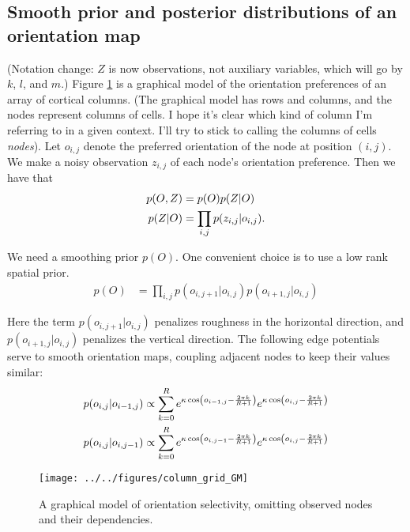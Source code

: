 \documentclass[11pt]{article}
\begin{document}
\subsection{Smooth prior and posterior distributions of an orientation map}

(Notation change: $Z$ is now observations, not auxiliary variables, which will go by $k$, $l$, and $m$.) Figure \ref{fig:som_gm0} is a graphical model of the orientation preferences of an array of cortical columns.  (The graphical model has rows and columns, and the nodes represent columns of cells. I hope it's clear which kind of column I'm referring to in a given context. I'll try to stick to calling the columns of cells {\it nodes}). Let $o_{i,j}$ denote the preferred orientation of the node at position $(i,j)$.  We make a noisy observation $z_{i,j}$ of each node's orientation preference. Then we have that
%
\begin{align}
p(O,Z) &= p(O) p(Z|O) \notag \\
p(Z|O) &= \prod_{i,j} p( z_{i,j} | o_{i,j} ).
\end{align}

We need a smoothing prior $p(O)$. One convenient choice is to use a low rank spatial prior.
%
\begin{align}
p(O) &= \prod_{i,j} p(o_{i,j+1}|o_{i,j}) p(o_{i+1,j}|o_{i,j})
\end{align}

\noindent Here the term $p(o_{i,j+1}|o_{i,j})$ penalizes roughness in the horizontal direction, and $p(o_{i+1,j}|o_{i,j})$ penalizes the vertical direction. The following edge potentials serve to smooth orientation maps, coupling adjacent nodes to keep their values similar:
%
\begin{align}
p(o_{i,j}|o_{i-1,j}) &\propto \sum_{k=0}^R e^{\kappa \cos\left(o_{i-1,j}-\frac{2\pi k}{R+1}\right)} e^{\kappa \cos\left(o_{i,j}-\frac{2\pi k}{R+1}\right)} \\
p(o_{i,j}|o_{i,j-1}) &\propto \sum_{k=0}^R e^{\kappa \cos\left(o_{i,j-1}-\frac{2\pi k}{R+1}\right)} e^{\kappa \cos\left(o_{i,j}-\frac{2\pi k}{R+1}\right)} \notag
\end{align}
%
\begin{figure}[h]
\centering
\texttt{[image: ../../figures/column\_grid\_GM]}
\caption{A graphical model of orientation selectivity, omitting observed nodes and their dependencies.}
\label{fig:som_gm0}
\end{figure}
\end{document}
